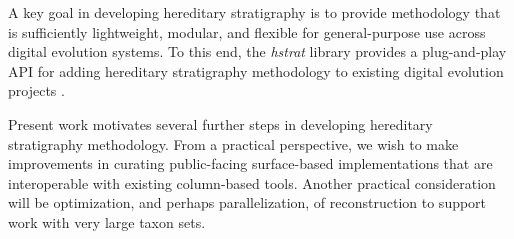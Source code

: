 
A key goal in developing hereditary stratigraphy is to provide methodology that is sufficiently lightweight, modular, and flexible for general-purpose use across digital evolution systems.
To this end, the \textit{hstrat} library provides a plug-and-play API for adding hereditary stratigraphy methodology to existing digital evolution projects \citep{moreno2022hstrat}.


Present work motivates several further steps in developing hereditary stratigraphy methodology.
From a practical perspective, we wish to make improvements in curating public-facing surface-based implementations that are interoperable with existing column-based tools.
Another practical consideration will be optimization, and perhaps parallelization, of reconstruction to support work with very large taxon sets.

